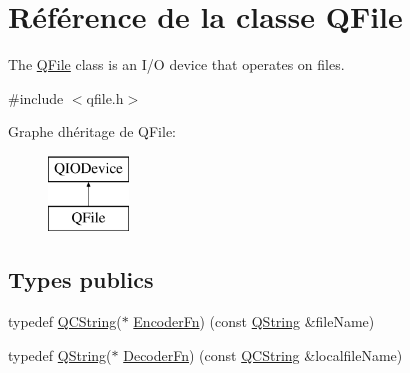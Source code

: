 \hypertarget{class_q_file}{}\section{Référence de la classe Q\+File}
\label{class_q_file}


The \hyperlink{class_q_file}{Q\+File} class is an I/\+O device that operates on files.  




{\ttfamily \#include $<$qfile.\+h$>$}

Graphe d\textquotesingle{}héritage de Q\+File\+:\begin{figure}[H]
\begin{center}
\leavevmode
\includegraphics[height=2.000000cm]{class_q_file}
\end{center}
\end{figure}
\subsection*{Types publics}
\begin{DoxyCompactItemize}
\item 
typedef \hyperlink{class_q_c_string}{Q\+C\+String}($\ast$ \hyperlink{class_q_file_abc28a2af8ddad44c42b316e9f15af9c2}{Encoder\+Fn}) (const \hyperlink{class_q_string}{Q\+String} \&file\+Name)
\item 
typedef \hyperlink{class_q_string}{Q\+String}($\ast$ \hyperlink{class_q_file_a79dc4d72e10f49d4430b299ebc34ec9e}{Decoder\+Fn}) (const \hyperlink{class_q_c_string}{Q\+C\+String} \&localfile\+Name)
\end{DoxyCompactItemize}
